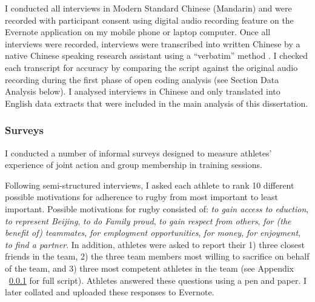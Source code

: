 I conducted all interviews in Modern Standard Chinese (Mandarin) and were recorded with participant consent using digital audio recording feature on the Evernote application on my mobile phone or laptop computer.  Once all interviews were recorded, interviews were transcribed into written Chinese by a native Chinese speaking research assistant using a ``verbatim'' method \citep[i.e., including an account of all verbal and important nonverbal (coughs, pauses, etc) utterances, see][269-70]{Poland2003}.  I checked each transcript for accuracy by comparing the script against the original audio recording during the first phase of open coding analysis (see Section Data Analysis below). I analysed interviews in Chinese and only translated into English data extracts that were included in the main analysis of this dissertation.


\subsubsection{Surveys}

   I conducted a number of informal surveys designed to measure athletes' experience of joint action and group membership in training sessions.

   Following semi-structured interviews, I asked each athlete to rank 10 different possible motivations for adherence to rugby from most important to least important. Possible motivations for rugby consisted of: \textit{to gain access to eduction}, \textit{to represent Beijing}, \textit{to do Family proud}, \textit{to gain respect from others}, \textit{for (the benefit of) teammates}, \textit{for employment opportunities}, \textit{for money}, \textit{for enjoyment}, \textit{to find a partner}. In addition, athletes were asked to report their 1) three closest friends in the team, 2) the three team members most willing to sacrifice on behalf of the team, and 3) three most competent athletes in the team (see Appendix ~\ref{} for full script). Athletes answered these questions using a pen and paper. I later collated and uploaded these responses to Evernote.


